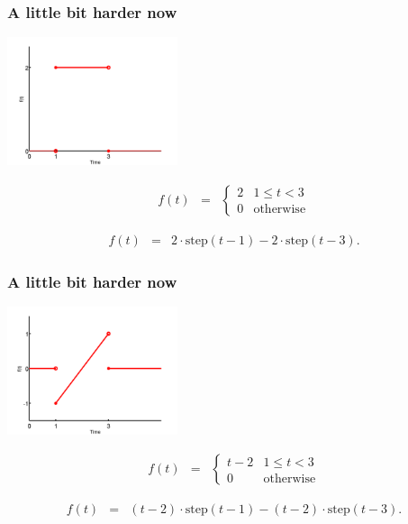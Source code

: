 \begin{frame}
  \frametitle{A little bit harder now}

  \centerline{\includegraphics[width=5cm]{img/stepEx2}}

  \begin{eqnarray*}
      f(t) & = & 
      \left\{
        \begin{array}{rr}
          2 & 1\leq t < 3 \\
          0 & \mathrm{otherwise}
        \end{array}
      \right.
  \end{eqnarray*}

  {
    \begin{eqnarray*}
      f(t) & = & 2\cdot\mathrm{step}(t-1) - 2\cdot\mathrm{step}(t-3).
    \end{eqnarray*}
  }

\end{frame}

\begin{frame}
  \frametitle{A little bit harder now}

  \centerline{\includegraphics[width=5cm]{img/stepEx3}}

  \begin{eqnarray*}
      f(t) & = & 
      \left\{
        \begin{array}{rr}
          t-2 & 1\leq t < 3 \\
          0 & \mathrm{otherwise}
        \end{array}
      \right.
  \end{eqnarray*}

  {
    \begin{eqnarray*}
      f(t) & = & (t-2)\cdot\mathrm{step}(t-1) - (t-2)\cdot\mathrm{step}(t-3).
    \end{eqnarray*}
  }

\end{frame}

